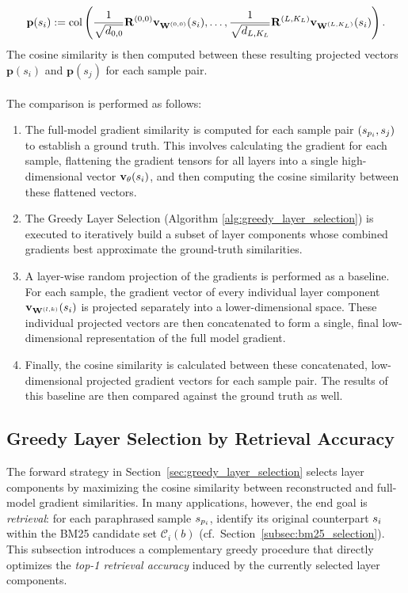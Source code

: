 \begin{equation}
    \mathbf{p}(s_i) := \operatorname{col}\left( \frac{1}{\sqrt{d_{0,0}}} \mathbf{R}^{(0,0)} \vXsi[\W^{(0,0)}], \dots, \frac{1}{\sqrt{d_{L,K_L}}} \mathbf{R}^{(L,K_L)} \vXsi[\W^{(L,K_L)}] \right).
\end{equation}
The cosine similarity is then computed between these resulting projected vectors $\mathbf{p}(s_i)$ and $\mathbf{p}(s_j)$ for each sample pair.
\\\\
The comparison is performed as follows:
\begin{enumerate}
    \item The {full-model gradient similarity} is computed for each sample pair $(\spi, \sj)$ to establish a ground truth. This involves calculating the gradient for each sample, flattening the gradient tensors for all layers into a single high-dimensional vector $\vXsi[\theta]$, and then computing the cosine similarity between these flattened vectors.
    \item The Greedy Layer Selection (Algorithm \ref{alg:greedy_layer_selection}) is executed to iteratively build a subset of layer components whose combined gradients best approximate the ground-truth similarities.
    \item A layer-wise random projection of the gradients is performed as a baseline. For each sample, the gradient vector of every individual layer component $\vXsi[\Wlk]$ is projected separately into a lower-dimensional space. These individual projected vectors are then concatenated to form a single, final low-dimensional representation of the full model gradient.
    \item Finally, the cosine similarity is calculated between these concatenated, low-dimensional projected gradient vectors for each sample pair. The results of this baseline are then compared against the ground truth as well. 
\end{enumerate}

\subsection{Greedy Layer Selection by Retrieval Accuracy}\label{subsec:gls_accuracy}
The forward strategy in Section~\ref{sec:greedy_layer_selection} selects layer components by maximizing the cosine similarity between reconstructed and full-model gradient similarities. In many applications, however, the end goal is \emph{retrieval}: for each paraphrased sample $\spi$, identify its original counterpart $\si$ within the BM25 candidate set $\mathcal{C}_i(b)$ (cf.\ Section~\ref{subsec:bm25_selection}). This subsection introduces a complementary greedy procedure that directly optimizes the \emph{top-1 retrieval accuracy} induced by the currently selected layer components.

